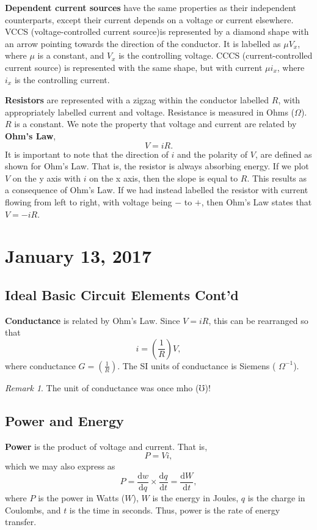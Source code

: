 \documentclass[11pt]{article}
\theoremstyle{plain} %
\theoremstyle{definition}
\theoremstyle{example}
\theoremstyle{remark}
\newtheorem*{remark}{Remark}
\begin{document}
\textbf{Dependent current sources} have the same properties as their independent counterparts, except their current depends on a voltage or current elsewhere. VCCS (voltage-controlled current source)is represented by a diamond shape with an arrow pointing towards the direction of the conductor. It is labelled as $\mu V_x$, where $\mu$ is a constant, and $V_x$ is the controlling voltage. CCCS (current-controlled current source) is represented with the same shape, but with current $\mu i_x$, where $i_x$ is the controlling current. 

\textbf{Resistors} are represented with a zigzag within the conductor labelled $R$, with appropriately labelled current and voltage. Resistance is measured in Ohms ($\Omega$). $R$ is a constant. We note the property that voltage and current are related by \textbf{Ohm's Law},
$$V = iR.$$
It is important to note that the direction of $i$ and the polarity of $V$, are defined as shown for  Ohm's Law. That is, the resistor is always absorbing energy. If we plot $V$ on the y axis with $i$ on the x axis, then the slope is equal to $R$. This results as a consequence of Ohm's Law. If we had instead labelled the resistor with current flowing from left to right, with voltage being $-$ to $+$, then Ohm's Law states that $V = -iR$. 

\section{January 13, 2017}

\subsection{Ideal Basic Circuit Elements Cont'd}

\textbf{Conductance} is related by Ohm's Law. Since $V = iR$, this can be rearranged so that $$i = \left(\frac{1}{R}\right)V,$$
where conductance $G = \left(\frac{1}{R}\right)$. The SI units of conductance is Siemens (
$\Omega^{-1}$).

\begin{remark} The unit of conductance was once mho ($\mho$)!
\end{remark}

\subsection{Power and Energy}

\textbf{Power} is the product of voltage and current. That is, 
$$P = Vi,$$
which we may also express as 
$$P = \frac{\mathrm d w}{\mathrm d q} \times \frac{\mathrm d q}{\mathrm d t} = \frac{\mathrm d W}{\mathrm d t},$$
where $P$ is the power in Watts ($W$), $W$ is the energy in Joules, $q$ is the charge in Coulombs, and $t$ is the time in seconds. Thus, power is the rate of energy transfer. 
\end{document}
